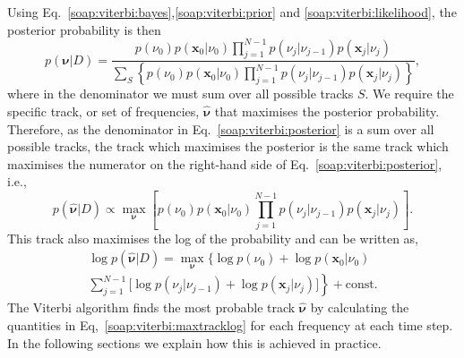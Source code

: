 Using Eq.~\ref{soap:viterbi:bayes},\ref{soap:viterbi:prior} and
\ref{soap:viterbi:likelihood}, the posterior probability is then
%
\begin{equation}
\label{soap:viterbi:posterior}
    p({\bm \nu} | D) =
    \frac{p(\nu_0)p({\bm x_0} | \nu_0) \displaystyle\prod_{j=1}^{N-1}p(\nu_{j}
| \nu_{j-1})p({\bm x_j} | \nu_j)}{\displaystyle\sum_{S}
\left\{p(\nu_0)p({\bm x_0} | \nu_0)\displaystyle\prod_{j=1}^{N-1}p(\nu_{j} |
\nu_{j-1})p({\bm x_j} | \nu_j)\right\}} ,
\end{equation}
%
where in the denominator we must sum over all possible tracks
$S$. We require the specific track, or set of frequencies, $\hat{\bm
\nu}$ that  maximises the posterior probability. Therefore, as the denominator in Eq.~\ref{soap:viterbi:posterior} is a sum over all possible tracks, the track which maximises the posterior is the same track which
maximises the numerator  on the right-hand side of  Eq.~\ref{soap:viterbi:posterior}, i.e.,
%
\begin{equation}
\label{soap:viterbi:maxtrack}
  p(\hat{\bm \nu} | D) \propto \max_{\bm \nu}{\left[p(\nu_0)p({\bm x_0} |
\nu_0) \prod_{j=1}^{N-1}p(\nu_{j} |\nu_{j-1})p({\bm x_j} | \nu_j)\right]}.
\end{equation}
%
This track also maximises the log of the probability and can be written as,
%
\begin{equation}
\label{soap:viterbi:maxtracklog}
\begin{split}
  \log p(\hat{\bm \nu} | D)  = \max_{{\bm \nu}}{\biggl\{ \log p(\nu_0) + \log p({\bm x_0} | \nu_0)  } \\
 \left. \sum_{j=1}^{N-1} \biggl[ \log p(\nu_{j} | \nu_{j-1}) + \log p({\bm x_j}
| \nu_j) \biggr] \right\} + \text{const}.
  \end{split}
\end{equation}
%
The Viterbi algorithm finds the most probable track $\hat{\bm \nu}$ by calculating the quantities in Eq,~\ref{soap:viterbi:maxtracklog} for each frequency at each time step. In the following sections we explain how this is achieved in practice.

